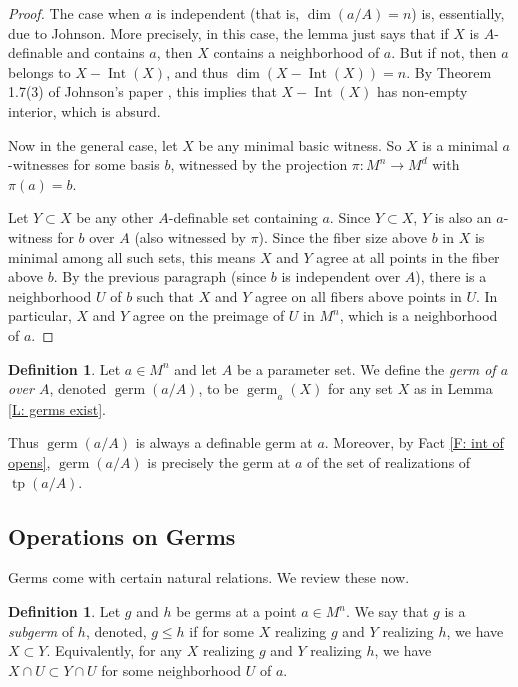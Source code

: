 \documentclass{amsart}
\theoremstyle{definition}
\newtheorem{definition}[theorem]{Definition}
\newcommand{\tp}{\operatorname{tp}}
\begin{document}
\begin{proof}
    The case when $a$ is independent (that is, $\dim(a/A)=n$) is, essentially, due to Johnson. More precisely, in this case, the lemma just says that if $X$ is $A$-definable and contains $a$, then $X$ contains a neighborhood of $a$. But if not, then $a$ belongs to $X-\operatorname{Int}(X)$, and thus $\dim(X-\operatorname{Int}(X))=n$. By Theorem 1.7(3) of Johnson's paper \cite{t-minimal-johnson}, this implies that $X-\operatorname{Int}(X)$ has non-empty interior, which is absurd.
        
    Now in the general case, let $X$ be any minimal basic witness. So $X$ is a minimal $a$-witnesses for some basis $b$, witnessed by the projection $\pi:M^n\rightarrow M^d$ with $\pi(a)=b$.
    
    Let $Y\subset X$ be any other $A$-definable set containing $a$. Since $Y\subset X$, $Y$ is also an $a$-witness for $b$ over $A$ (also witnessed by $\pi$). Since the fiber size above $b$ in $X$ is minimal among all such sets, this means $X$ and $Y$ agree at all points in the fiber above $b$. By the previous paragraph (since $b$ is independent over $A$), there is a neighborhood $U$ of $b$ such that $X$ and $Y$ agree on all fibers above points in $U$. In particular, $X$ and $Y$ agree on the preimage of $U$ in $M^n$, which is a neighborhood of $a$.
\end{proof}

\begin{definition}
 Let $a\in M^n$ and let $A$ be a parameter set. We define the \textit{germ of $a$ over $A$}, denoted $\operatorname{germ}(a/A)$, to be $\operatorname{germ}_a(X)$ for any set $X$ as in Lemma \ref{L: germs exist}. 
\end{definition}

Thus $\operatorname{germ}(a/A)$ is always a definable germ at $a$. Moreover, by Fact \ref{F: int of opens}, $\operatorname{germ}(a/A)$ is precisely the germ at $a$ of the set of realizations of $\tp(a/A)$.

\subsection{Operations on Germs}

Germs come with certain natural relations. We review these now. 

\begin{definition}
    Let $g$ and $h$ be germs at a point $a\in M^n$. We say that $g$ is a \textit{subgerm} of $h$, denoted, $g\leq h$ if for some $X$ realizing $g$ and $Y$ realizing $h$, we have $X\subset Y$. Equivalently, for any $X$ realizing $g$ and $Y$ realizing $h$, we have $X\cap U\subset Y\cap U$ for some neighborhood $U$ of $a$.
\end{definition}
\end{document}
